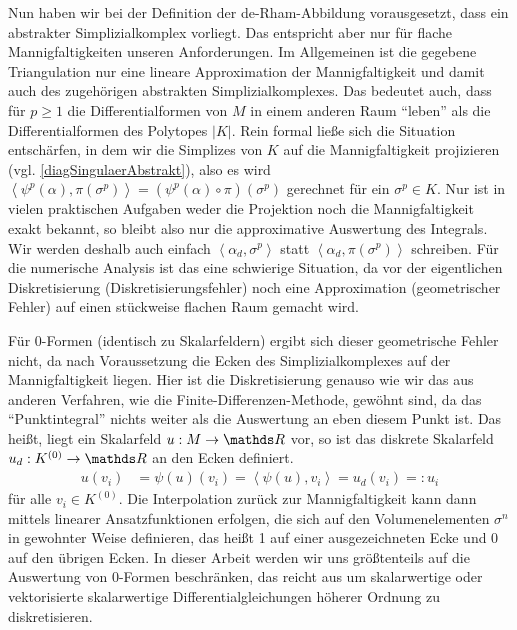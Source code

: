   \begin{bemerkung}
    Nun haben wir bei der Definition der de-Rham-Abbildung vorausgesetzt, dass ein abstrakter Simplizialkomplex vorliegt.
    Das entspricht aber nur für flache Mannigfaltigkeiten unseren Anforderungen.
    Im Allgemeinen ist die gegebene Triangulation nur eine lineare Approximation der Mannigfaltigkeit und damit auch des zugehörigen abstrakten Simplizialkomplexes.
    Das bedeutet auch, dass für \( p \ge 1 \) die Differentialformen von \( M \) in einem anderen Raum "`leben"' als die Differentialformen des Polytopes \( |K| \).
    Rein formal ließe sich die Situation entschärfen, in dem wir die Simplizes von \( K \) auf die Mannigfaltigkeit projizieren (vgl. \eqref{diagSingulaerAbstrakt}), also es wird
    \( \left\langle \psi^{p}(\alpha), \pi(\sigma^{p}) \right\rangle = \left( \psi^{p}(\alpha) \circ \pi \right)(\sigma^{p}) \) gerechnet für ein \( \sigma^{p}\in K \).
    Nur ist in vielen praktischen Aufgaben weder die Projektion noch die Mannigfaltigkeit exakt bekannt, so bleibt also nur die approximative Auswertung des Integrals.
    Wir werden deshalb auch einfach  \( \left\langle \alpha_{d}, \sigma^{p} \right\rangle \) statt \( \left\langle \alpha_{d}, \pi(\sigma^{p}) \right\rangle \) schreiben.
    Für die numerische Analysis ist das eine schwierige Situation, da vor der eigentlichen Diskretisierung (Diskretisierungsfehler) noch eine Approximation (geometrischer Fehler) auf einen stückweise
    flachen Raum gemacht wird.

    Für \( 0 \)-Formen (identisch zu Skalarfeldern) ergibt sich dieser geometrische Fehler nicht, da nach Voraussetzung die Ecken des Simplizialkomplexes auf der Mannigfaltigkeit liegen.
    Hier ist die Diskretisierung genauso wie wir das aus anderen Verfahren, wie die Finite-Differenzen-Methode, gewöhnt sind, da das "`Punktintegral"' nichts weiter als die Auswertung an
    eben diesem Punkt ist.
    Das heißt, liegt ein Skalarfeld \( u:M\rightarrow\R \) vor, so ist das diskrete Skalarfeld \( u_{d}:K^{(0)} \rightarrow \R \) an den Ecken definiert.
    \begin{align}
      u(v_{i}) &=  \psi(u)(v_{i}) = \left\langle \psi(u), v_{i} \right\rangle= u_{d}(v_{i}) =: u_{i} 
    \end{align}
    für alle \( v_{i} \in K^{(0)} \).
    Die Interpolation zurück zur Mannigfaltigkeit kann dann mittels linearer Ansatzfunktionen erfolgen, die sich auf den Volumenelementen \( \sigma^{n} \) in gewohnter
    Weise definieren, das heißt 1 auf einer ausgezeichneten Ecke und 0 auf den übrigen Ecken.
    In dieser Arbeit werden wir uns größtenteils auf die Auswertung von \( 0 \)-Formen beschränken, das reicht aus um skalarwertige oder vektorisierte skalarwertige Differentialgleichungen höherer
    Ordnung zu diskretisieren.


\end{bemerkung}
